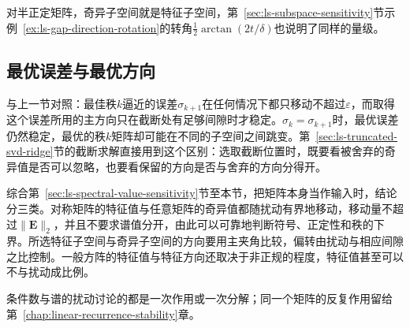 对半正定矩阵，奇异子空间就是特征子空间，第~\ref{sec:ls-subspace-sensitivity}节示例~\ref{ex:ls-gap-direction-rotation}的转角$\tfrac12\arctan(2t/\delta)$也说明了同样的量级。

\subsection{最优误差与最优方向}
与上一节对照：最佳秩$k$逼近的误差$\sigma_{k+1}$在任何情况下都只移动不超过$\varepsilon$，而取得这个误差所用的主方向只在截断处有足够间隙时才稳定。$\sigma_k=\sigma_{k+1}$时，最优误差仍然稳定，最优的秩$k$矩阵却可能在不同的子空间之间跳变。第~\ref{sec:ls-truncated-svd-ridge}节的截断求解直接用到这个区别：选取截断位置时，既要看被舍弃的奇异值是否可以忽略，也要看保留的方向是否与舍弃的方向分得开。

综合第~\ref{sec:ls-spectral-value-sensitivity}节至本节，把矩阵本身当作输入时，结论分三类。对称矩阵的特征值与任意矩阵的奇异值都随扰动有界地移动，移动量不超过$\lVert\bm E\rVert_2$，并且不要求谱值分开，由此可以可靠地判断符号、正定性和秩的下界。所选特征子空间与奇异子空间的方向要用主夹角比较，偏转由扰动与相应间隙之比控制。一般方阵的特征值与特征方向还取决于非正规的程度，特征值甚至可以不与扰动成比例。

条件数与谱的扰动讨论的都是一次作用或一次分解；同一个矩阵的反复作用留给第~\ref{chap:linear-recurrence-stability}章。
